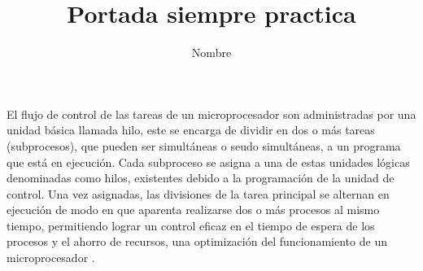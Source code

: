 \documentclass[12pt,letterpaper]{article}
\author{Nombre}
\title{Portada siempre practica}
\begin{document}
\setlength{\parindent}{0cm}
\normalsize
El flujo de control de las tareas de un microprocesador son administradas por una unidad básica llamada hilo, este se encarga de dividir en dos o más tareas (subprocesos), que pueden ser simultáneas o seudo simultáneas, a un programa que está en ejecución. Cada subproceso se asigna a una de estas unidades lógicas denominadas como hilos, existentes debido a la programación de la unidad de control. Una vez asignadas, las divisiones de la tarea principal se alternan en ejecución de modo en que aparenta realizarse dos o más procesos al mismo tiempo, permitiendo lograr un control eficaz en el tiempo de espera de los procesos y el ahorro de recursos, una optimización del funcionamiento de un microprocesador \cite{Threading}. \\[0.5cm]
\end{document}
